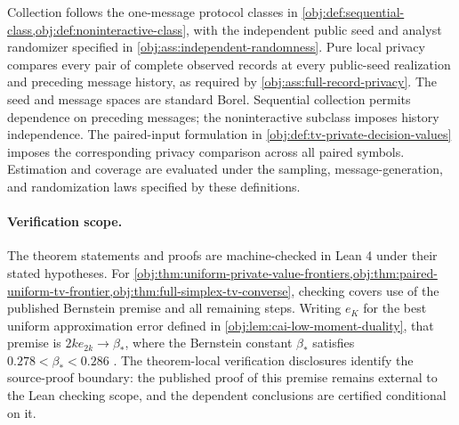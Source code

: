 Collection follows the one-message protocol classes in \cref{obj:def:sequential-class,obj:def:noninteractive-class}, with the independent public seed and analyst randomizer specified in \cref{obj:ass:independent-randomness}. Pure local privacy compares every pair of complete observed records at every public-seed realization and preceding message history, as required by \cref{obj:ass:full-record-privacy}. The seed and message spaces are standard Borel. Sequential collection permits dependence on preceding messages; the noninteractive subclass imposes history independence. The paired-input formulation in \cref{obj:def:tv-private-decision-values} imposes the corresponding privacy comparison across all paired symbols. Estimation and coverage are evaluated under the sampling, message-generation, and randomization laws specified by these definitions.

\paragraph{Verification scope.}
The theorem statements and proofs are machine-checked in Lean 4 under their stated hypotheses. For \cref{obj:thm:uniform-private-value-frontiers,obj:thm:paired-uniform-tv-frontier,obj:thm:full-simplex-tv-converse}, checking covers use of the published Bernstein premise and all remaining steps. Writing \(e_K\) for the best uniform approximation error defined in \cref{obj:lem:cai-low-moment-duality}, that premise is \(2k e_{2k}\to\beta_*\), where the Bernstein constant \(\beta_*\) satisfies \(0.278<\beta_*<0.286\) \citep[Section 3.1, definition of the Bernstein constant and immediately following paragraph, p.~8]{CaiLow2011Nonsmooth}. The theorem-local verification disclosures identify the source-proof boundary: the published proof of this premise remains external to the Lean checking scope, and the dependent conclusions are certified conditional on it.
